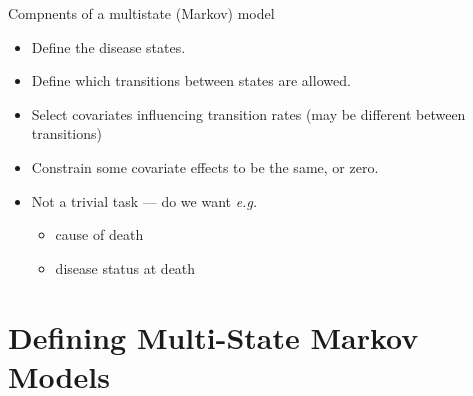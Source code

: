 \begin{frame}{Compnents of a multistate (Markov) model}
  \begin{itemize}
    \item Define the disease states.
    \item Define which transitions between states are allowed.
    \item Select covariates influencing transition rates (may be
      different between transitions)
    \item Constrain some covariate effects to be the same, or zero.
    \item Not a trivial task --- do we want \textit{e.g.}

      \begin{itemize}
      \item cause of death
      \item disease status at death
      \end{itemize}

  \end{itemize}
\end{frame}

\section{Defining Multi-State Markov Models}


